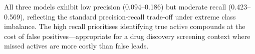 \documentclass[conference]{IEEEtran}
\begin{document}
All three models exhibit low precision (0.094--0.186) but moderate recall (0.423--0.569), reflecting the standard precision-recall trade-off under extreme class imbalance. The high recall prioritises identifying true active compounds at the cost of false positives---appropriate for a drug discovery screening context where missed actives are more costly than false leads.
\end{document}
